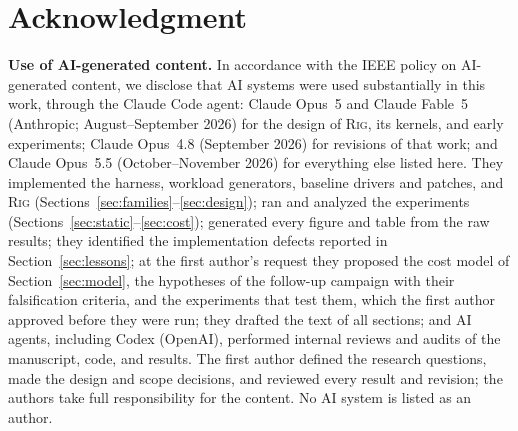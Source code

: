 \documentclass[conference]{IEEEtran}
\newcommand{\rig}{\textsc{Rig}}
\begin{document}
\section*{Acknowledgment}
\textbf{Use of AI-generated content.} In accordance with the IEEE policy on AI-generated content, we disclose that AI systems were used substantially in this work, through the Claude Code agent: Claude Opus~5 and Claude Fable~5 (Anthropic; August--September 2026) for the design of \rig, its kernels, and early experiments; Claude Opus~4.8 (September 2026) for revisions of that work; and Claude Opus~5.5 (October--November 2026) for everything else listed here. They implemented the harness, workload generators, baseline drivers and patches, and \rig{} (Sections~\ref{sec:families}--\ref{sec:design}); ran and analyzed the experiments (Sections~\ref{sec:static}--\ref{sec:cost}); generated every figure and table from the raw results; they identified the implementation defects reported in Section~\ref{sec:lessons}; at the first author's request they proposed the cost model of Section~\ref{sec:model}, the hypotheses of the follow-up campaign with their falsification criteria, and the experiments that test them, which the first author approved before they were run; they drafted the text of all sections; and AI agents, including Codex (OpenAI), performed internal reviews and audits of the manuscript, code, and results. The first author defined the research questions, made the design and scope decisions, and reviewed every result and revision; the authors take full responsibility for the content. No AI system is listed as an author.
\end{document}
